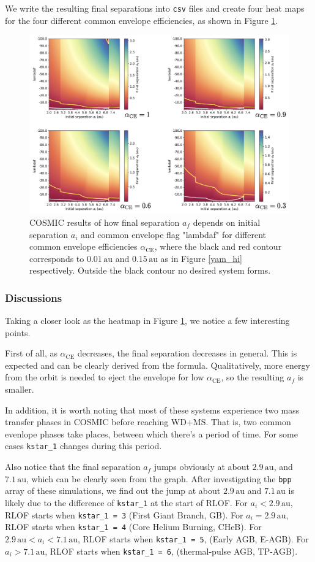 \documentclass[12pt]{article}
\newcommand{\alphace}{\alpha_{\mathrm{CE}}}
\newcommand{\au}{\, \mathrm{au}}
\begin{document}
We write the resulting final separations into \verb|csv| files and create four heat maps for the four different common envelope efficiencies, as shown in Figure \ref{res_hi}.

\begin{figure}
    \centering
    \includegraphics[width=0.9\linewidth]{7+1results.png}
    \caption{COSMIC results of how final separation $a_f$ depends on initial separation $a_i$ and common envelope flag "lambdaf" for different common envelope efficiencies $\alphace$, where the black and red contour corresponds to $0.01 \au$ and $0.15 \au$ as in Figure \ref{yam_hi} respectively. Outside the black contour no desired system forms.}
    \label{res_hi}
\end{figure}

\subsubsection{Discussions}
Taking a closer look as the heatmap in Figure \ref{res_hi}, we notice a few interesting points. 

First of all, as $\alphace$ decreases, the final separation decreases in general. This is expected and can be clearly derived from the formula. Qualitatively, more energy from the orbit is needed to eject the envelope for low $\alphace$, so the resulting $a_f$ is smaller. 

In addition, it is worth noting that most of these systems experience two mass transfer phases in COSMIC before reaching WD+MS. That is, two common evenlope phases take places, between which there's a period of time. For some cases \verb|kstar_1| changes during this period.

Also notice that the final separation $a_f$ jumps obviously at about $2.9 \au$, and $7.1 \au$, which can be clearly seen from the graph. After investigating the \verb|bpp| array of these simulations, we find out the jump at about $2.9 \au$ and $7.1 \au$ is likely due to the difference of \verb|kstar_1| at the start of RLOF. For $a_i < 2.9 \au$, RLOF starts when \verb|kstar_1 = 3| (First Giant Branch, GB). For $a_i = 2.9 \au$, RLOF starts when \verb|kstar_1 = 4| (Core Helium Burning, CHeB). For $2.9 \au < a_i < 7.1 \au$, RLOF starts when \verb|kstar_1 = 5|, (Early AGB, E-AGB). For $a_i > 7.1 \au$, RLOF starts when \verb|kstar_1 = 6|, (thermal-pulse AGB, TP-AGB). 
\end{document}
